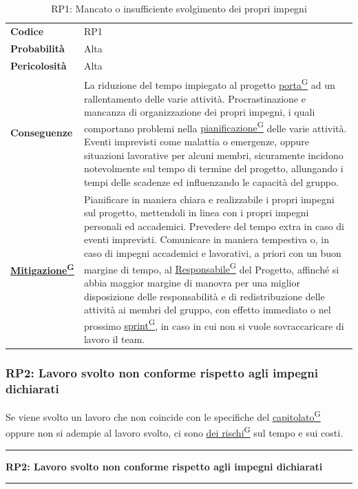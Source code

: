 \documentclass[a4paper,12pt]{article}
\providecommand{\glslink}[2]{\href{https://alittlebyte-19.github.io/Documentazione/glossario.html\#gls-#1}{\underline{#2}\textsuperscript{\scriptsize G}}}
\begin{document}
\begin{table}[h]
\begin{tabular}{>{\bfseries}p{3cm} | p{12.2cm}}
Codice & RP1 \\

Probabilità & Alta\\

Pericolosità & Alta\\

Conseguenze & La riduzione del tempo impiegato al progetto \glslink{porta}{porta} ad un rallentamento delle varie attività. Procrastinazione e mancanza di organizzazione dei propri impegni,
i quali comportano problemi nella \glslink{pianificazione}{pianificazione} delle varie attività. Eventi imprevisti come malattia o emergenze, oppure situazioni lavorative per alcuni membri, sicuramente 
incidono notevolmente sul tempo di termine del progetto, allungando i tempi delle scadenze ed influenzando le capacità del gruppo.\\

\glslink{mitigazione-dei-rischi}{Mitigazione} & Pianificare in maniera chiara e realizzabile i propri impegni sul progetto, mettendoli in linea con i propri impegni personali ed accademici.
Prevedere del tempo extra in caso di eventi imprevisti. Comunicare in maniera tempestiva o, in caso di impegni accademici e lavorativi, a priori con un buon margine di tempo, al \glslink{responsabile}{Responsabile} del Progetto, affinché si abbia maggior margine
di manovra per una miglior disposizione delle responsabilità e di redistribuzione delle attività ai membri del gruppo, con effetto immediato o nel prossimo \glslink{sprint}{sprint}, in caso in cui 
non si vuole sovraccaricare di lavoro il team. \\
\end{tabular}
\caption{RP1: Mancato o insufficiente svolgimento dei propri impegni}
\end{table}

\newpage

\subsubsection{RP2: Lavoro svolto non conforme rispetto agli impegni dichiarati}
Se viene svolto un lavoro che non coincide con le specifiche del \glslink{capitolato}{capitolato} oppure non si adempie al lavoro svolto, ci sono \glslink{mitigazione-dei-rischi}{dei rischi} sul tempo e sui costi.
\vspace{0.5cm}
\hrule
\vspace{0.5em}
\textbf{RP2: Lavoro svolto non conforme rispetto agli impegni dichiarati}
\vspace{0.5em}
\hrule
\vspace{1cm}
\end{document}
